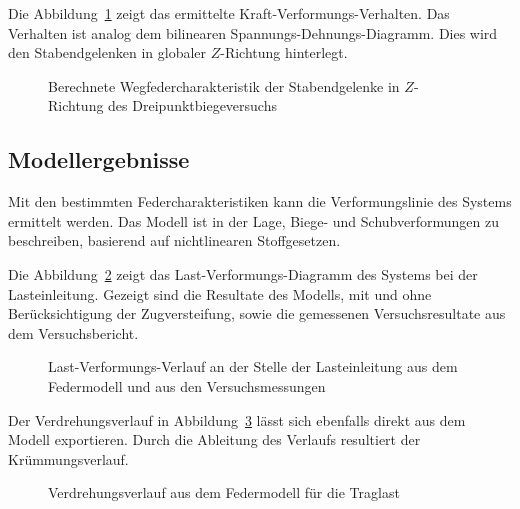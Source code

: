 \documentclass[
  11pt,
  letterpaper,
]{scrreprt}
\begin{document}
Die Abbildung~\ref{fig-wegfeder-schub-a3v2} zeigt das ermittelte
Kraft-Verformungs-Verhalten. Das Verhalten ist analog dem bilinearen
Spannungs-Dehnungs-Diagramm. Dies wird den Stabendgelenken in globaler
\(Z\)-Richtung hinterlegt.

\begin{figure}[H]


\caption{\label{fig-wegfeder-schub-a3v2}Berechnete
Wegfedercharakteristik der Stabendgelenke in \(Z\)-Richtung des
Dreipunktbiegeversuchs}

\end{figure}%

\subsection{Modellergebnisse}\label{modellergebnisse}

Mit den bestimmten Federcharakteristiken kann die Verformungslinie des
Systems ermittelt werden. Das Modell ist in der Lage, Biege- und
Schubverformungen zu beschreiben, basierend auf nichtlinearen
Stoffgesetzen.

Die Abbildung~\ref{fig-fwa3v2} zeigt das Last-Verformungs-Diagramm des
Systems bei der Lasteinleitung. Gezeigt sind die Resultate des Modells,
mit und ohne Berücksichtigung der Zugversteifung, sowie die gemessenen
Versuchsresultate aus dem Versuchsbericht.

\begin{figure}[H]


\caption{\label{fig-fwa3v2}Last-Verformungs-Verlauf an der Stelle der
Lasteinleitung aus dem Federmodell und aus den Versuchsmessungen}

\end{figure}%

Der Verdrehungsverlauf in Abbildung~\ref{fig-phi-max-a3v2} lässt sich
ebenfalls direkt aus dem Modell exportieren. Durch die Ableitung des
Verlaufs resultiert der Krümmungsverlauf.

\begin{figure}[H]


\caption{\label{fig-phi-max-a3v2}Verdrehungsverlauf aus dem Federmodell
für die Traglast}

\end{figure}%
\end{document}
